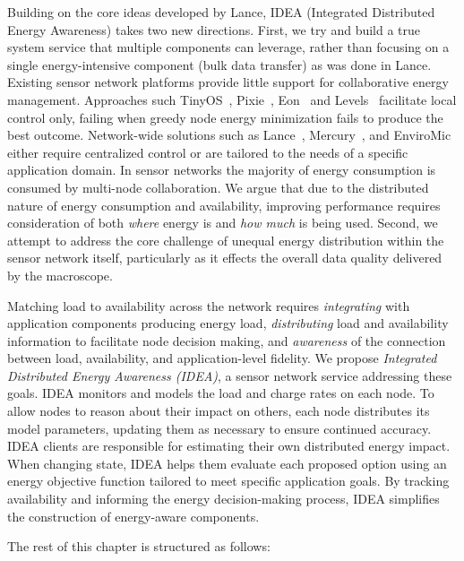 Building on the core ideas developed by Lance, IDEA (Integrated Distributed
Energy Awareness) takes two new directions. First, we try and build a true
system service that multiple components can leverage, rather than focusing on
a single energy-intensive component (bulk data transfer) as was done in
Lance. Existing sensor network platforms provide little support for
collaborative energy management. Approaches such
TinyOS~\cite{tinyos-asplos00}, Pixie~\cite{pixie-sensys08},
Eon~\cite{eon-sensys07} and Levels~\cite{levels-sensys07} facilitate local
control only, failing when greedy node energy minimization fails to produce
the best outcome. Network-wide solutions such as Lance~\cite{lance-sensys08},
Mercury~\cite{parkinsons-embs07}, and EnviroMic~\cite{enviromic} either
require centralized control or are tailored to the needs of a specific
application domain. In sensor networks the majority of energy consumption is
consumed by multi-node collaboration. We argue that due to the distributed
nature of energy consumption and availability, improving performance requires
consideration of both \textit{where} energy is and \textit{how much} is being
used. Second, we attempt to address the core challenge of unequal energy
distribution within the sensor network itself, particularly as it effects the
overall data quality delivered by the macroscope.

Matching load to availability across the network requires
\textit{integrating} with application components producing energy load,
\textit{distributing} load and availability information to facilitate node
decision making, and \textit{awareness} of the connection between load,
availability, and application-level fidelity. We propose \textit{Integrated
Distributed Energy Awareness (IDEA)}, a sensor network service addressing
these goals. IDEA monitors and models the load and charge rates on each node.
To allow nodes to reason about their impact on others, each node distributes
its model parameters, updating them as necessary to ensure continued
accuracy. IDEA clients are responsible for estimating their own distributed
energy impact. When changing state, IDEA helps them evaluate each proposed
option using an energy objective function tailored to meet specific
application goals. By tracking availability and informing the energy
decision-making process, IDEA simplifies the construction of energy-aware
components.

The rest of this chapter is structured as follows:

